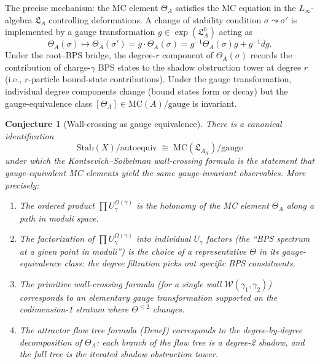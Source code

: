 \documentclass[11pt]{article}
\newtheorem{conjecture}[theorem]{Conjecture}
\theoremstyle{definition}
\newcommand{\MC}{\mathrm{MC}}
\begin{document}
The precise mechanism: the MC element $\Theta_A$ satisfies the MC
equation in the $L_\infty$-algebra $\mathfrak{L}_A$ controlling
deformations. A change of stability condition $\sigma \leadsto
\sigma'$ is implemented by a gauge transformation $g \in
\exp(\mathfrak{L}_A^0)$ acting as
\[
 \Theta_A(\sigma) \longmapsto \Theta_A(\sigma')
 = g \cdot \Theta_A(\sigma)
 = g^{-1} \Theta_A(\sigma) g + g^{-1} dg.
\]
Under the root--BPS bridge, the degree-$r$ component of
$\Theta_A(\sigma)$ records the contribution of charge-$\gamma$ BPS
states to the shadow obstruction tower at degree $r$ (i.e.,
$r$-particle bound-state contributions). Under the
gauge transformation, individual degree components change (bound
states form or decay) but the gauge-equivalence class $[\Theta_A]
\in \MC(A)/\text{gauge}$ is invariant.

\begin{conjecture}[Wall-crossing as gauge equivalence]
\label{conj:wc-gauge}
There is a canonical identification
\[
 \mathrm{Stab}(X) / \text{autoequiv}
 \;\cong\; \MC(\mathfrak{L}_{A_X}) / \text{gauge}
\]
under which the Kontsevich--Soibelman wall-crossing formula is the
statement that gauge-equivalent MC elements yield the same
gauge-invariant observables. More precisely:
\begin{enumerate}[label=(\roman*)]
 \item The ordered product $\prod U_\gamma^{\Omega(\gamma)}$ is
 the holonomy of the MC element $\Theta_A$ along a path in
 moduli space.

 \item The factorization of $\prod U_\gamma^{\Omega(\gamma)}$ into
 individual $U_\gamma$ factors (the ``BPS spectrum at a given
 point in moduli'') is the choice of a representative $\Theta$ in
 its gauge-equivalence class: the degree filtration picks out
 specific BPS constituents.

 \item The primitive wall-crossing formula (for a single wall
 $\mathcal{W}(\gamma_1,\gamma_2)$) corresponds to an elementary
 gauge transformation supported on the codimension-1 stratum
 where $\Theta^{\leq 2}$ changes.

 \item The attractor flow tree formula (Denef) corresponds to the
 degree-by-degree decomposition of $\Theta_A$: each branch of the
 flow tree is a degree-2 shadow, and the full tree is the iterated
 shadow obstruction tower.
\end{enumerate}
\end{conjecture}
\end{document}
